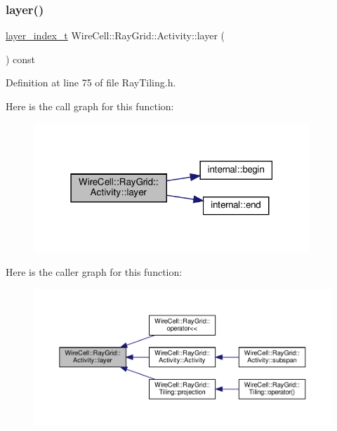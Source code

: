 \subsubsection{\texorpdfstring{layer()}{layer()}}
{\footnotesize\ttfamily \hyperlink{namespace_wire_cell_1_1_ray_grid_ab7562e54b58eede813d5b70b5eb85812}{layer\+\_\+index\+\_\+t} Wire\+Cell\+::\+Ray\+Grid\+::\+Activity\+::layer (\begin{DoxyParamCaption}{ }\end{DoxyParamCaption}) const\hspace{0.3cm}{\ttfamily [inline]}}



Definition at line 75 of file Ray\+Tiling.\+h.

Here is the call graph for this function\+:
\nopagebreak
\begin{figure}[H]
\begin{center}
\leavevmode
\includegraphics[width=295pt]{class_wire_cell_1_1_ray_grid_1_1_activity_a871b9e9a8f3d3fbc728ce1c50ef39ece_cgraph}
\end{center}
\end{figure}
Here is the caller graph for this function\+:
\nopagebreak
\begin{figure}[H]
\begin{center}
\leavevmode
\includegraphics[width=350pt]{class_wire_cell_1_1_ray_grid_1_1_activity_a871b9e9a8f3d3fbc728ce1c50ef39ece_icgraph}
\end{center}
\end{figure}
\mbox{\label{class_wire_cell_1_1_ray_grid_1_1_activity_a08432ca0d7411ba1c990e2e53b46975d}} 

